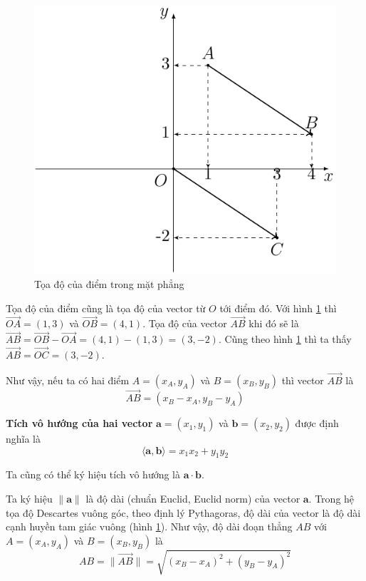 \begin{figure}[ht]
	\centering
	\includegraphics[page=1]{analytic_geometry/oxy1.pdf}
	\caption{Tọa độ của điểm trong mặt phẳng}
	\label{oxy1}
\end{figure}

Tọa độ của điểm cũng là tọa độ của vector từ $O$ tới điểm đó. Với hình \ref{oxy1} thì $\overrightarrow{OA} = (1, 3)$ và $\overrightarrow{OB} = (4, 1)$. Tọa độ của vector $\overrightarrow{AB}$ khi đó sẽ là $\overrightarrow{AB} = \overrightarrow{OB} - \overrightarrow{OA} = (4, 1) - (1, 3) = (3, -2)$. Cũng theo hình \ref{oxy1} thì ta thấy $\overrightarrow{AB} = \overrightarrow{OC} = (3, -2)$. 

Như vậy, nếu ta có hai điểm $A = (x_A, y_A)$ và $B = (x_B, y_B)$ thì vector $\overrightarrow{AB}$ là
\begin{equation}
	\overrightarrow{AB} = (x_B - x_A, y_B - y_A)
\end{equation}

\textbf{Tích vô hướng của hai vector} $\bm{a} = (x_1, y_1)$ và $\bm{b} = (x_2, y_2)$ được định nghĩa là
\begin{equation}
	\langle \bm{a}, \bm{b} \rangle = x_1 x_2 + y_1 y_2
\end{equation}

Ta cũng có thể ký hiệu tích vô hướng là $\bm{a} \cdot \bm{b}$.

Ta ký hiệu $\lVert \bm{a} \rVert$ là độ dài (chuẩn Euclid, Euclid norm) của vector $\bm{a}$. Trong hệ tọa độ Descartes vuông góc, theo định lý Pythagoras, độ dài của vector là độ dài cạnh huyền tam giác vuông (hình \ref{oxy1}). Như vậy, độ dài đoạn thẳng $AB$ với $A = (x_A, y_A)$ và $B = (x_B, y_B)$ là
\begin{equation}
	AB = \lVert \overrightarrow{AB} \rVert = \sqrt{(x_B - x_A)^2 + (y_B - y_A)^2}
\end{equation}

